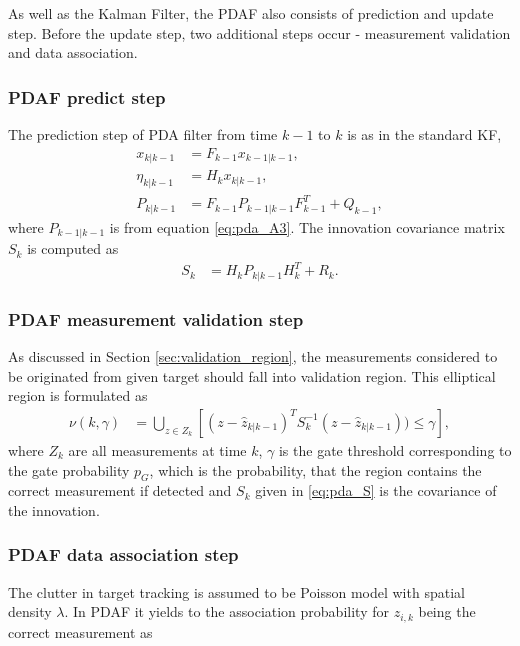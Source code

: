 As well as the Kalman Filter, the PDAF also consists of prediction and update step. Before the update step, two additional steps occur - measurement validation and data association. 
 \subsubsection{PDAF predict step}
The prediction step of PDA filter from time $k-1$ to $k$ is as in the standard KF,
\begin{align}
    x_{k|k-1} &= F_{k-1}x_{k-1|k-1},\\
    \eta_{k|k-1} &= H_k x_{k|k-1},\\
    P_{k|k-1} &= F_{k-1} P_{k-1|k-1} F_{k-1}^T + Q_{k-1},
\end{align}
where $P_{k-1|k-1}$ is from equation \eqref{eq:pda_A3}. The innovation covariance matrix $S_k$ is computed as
\begin{align}
    S_k &= H_{k} P_{k|k-1} H_{k}^T + R_{k}. \label{eq:pda_S}
\end{align}

\subsubsection{PDAF measurement validation step}
As discussed in Section \ref{sec:validation_region}, the measurements considered to be originated from given target should fall into validation region. This elliptical region is formulated as
\begin{align}
    \nu(k,\gamma) &= \bigcup_{z \in Z_k}[(z - \hat{z}_{k|k-1})^T S_k^{-1} (z - \hat{z}_{k|k-1})) \leq \gamma], \label {eq:validation_region}
\end{align}
where $Z_k$ are all measurements at time $k$, $\gamma$ is the gate threshold corresponding to the gate probability $p_G$, which is the probability, that the region contains the correct measurement if detected and $S_k$ given in \eqref{eq:pda_S} is the covariance of the innovation.

\subsubsection{PDAF data association step}
The clutter in target tracking is assumed to be Poisson model with spatial density $\lambda$. In PDAF it yields to the association probability for $z_{i,k}$ being the correct measurement as

\vspace{-0.5cm}

